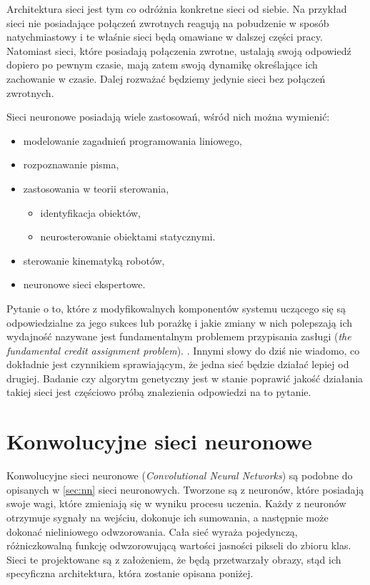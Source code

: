 Architektura sieci jest tym co odróżnia konkretne sieci od siebie.
Na przykład sieci nie posiadające połączeń zwrotnych reagują na pobudzenie w sposób natychmiastowy i te właśnie sieci będą omawiane w dalszej części pracy.
Natomiast sieci, które posiadają połączenia zwrotne, ustalają swoją odpowiedź dopiero po pewnym czasie, mają zatem swoją dynamikę określające ich zachowanie w czasie. \cite{zuradabarskijedruch1996}
Dalej rozważać będziemy jedynie sieci bez połączeń zwrotnych.

Sieci neuronowe posiadają wiele zastosowań, wśród nich można wymienić:
\begin{itemize}
	\item modelowanie zagadnień programowania liniowego,
	\item rozpoznawanie pisma,
	\item zastosowania w teorii sterowania,
	\begin{itemize}
		\item identyfikacja obiektów,
		\item neurosterowanie obiektami statycznymi.
	\end{itemize}
	\item sterowanie kinematyką robotów,
	\item neuronowe sieci ekspertowe. \cite{zuradabarskijedruch1996}
\end{itemize}

Pytanie o to, które z modyfikowalnych komponentów systemu uczącego się są odpowiedzialne za jego sukces lub porażkę i jakie zmiany w nich polepszają ich wydajność nazywane jest fundamentalnym problemem przypisania zasługi (\textit{the fundamental credit assignment problem}). \cite{SCHMIDHUBER201585}.
Innymi słowy do dziś nie wiadomo, co dokładnie jest czynnikiem sprawiającym, że jedna sieć będzie działać lepiej od drugiej.
Badanie czy algorytm genetyczny jest w stanie poprawić jakość działania takiej sieci jest częściowo próbą znalezienia odpowiedzi na to pytanie.

\section{Konwolucyjne sieci neuronowe}\label{sec:cnn}

Konwolucyjne sieci neuronowe (\textit{Convolutional Neural Networks}) są podobne do opisanych w \ref{sec:nn} sieci neuronowych.
Tworzone są z neuronów, które posiadają swoje wagi, które zmieniają się w wyniku procesu uczenia.
Każdy z neuronów otrzymuje sygnały na wejściu, dokonuje ich sumowania, a następnie może dokonać nieliniowego odwzorowania.
Cała sieć wyraża pojedynczą, różniczkowalną funkcję odwzorowującą wartości jasności pikseli do zbioru klas.
Sieci te projektowane są z założeniem, że będą przetwarzały obrazy, stąd ich specyficzna architektura, która zostanie opisana poniżej.

